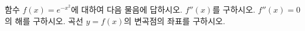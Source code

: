함수 $f(x)=e^{-x^2}$에 대하여 다음 물음에 답하시오.
 $f''(x)$를 구하시오.
 $f''(x)=0$의 해를 구하시오.
 곡선 $y=f(x)$의 변곡점의 좌표를 구하시오.
